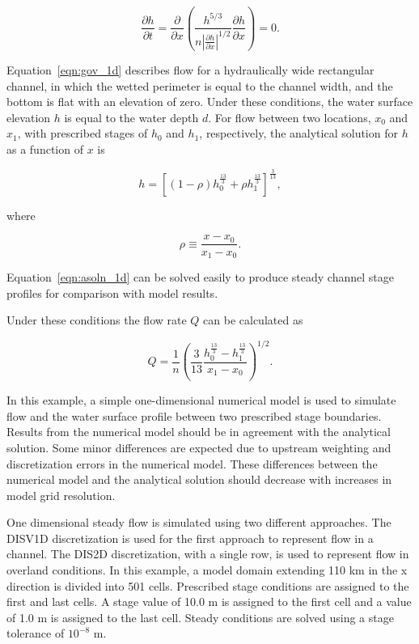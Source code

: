\documentclass[fleqn]{article}
\begin{document}
\begin{equation}
  \frac{\partial h}{\partial t} = \frac{\partial}{\partial x} 
  \left ( \frac{h^{5/3}}{n \left | \frac{\partial h}{\partial x} \right |^{1/2}} 
  \frac{\partial h}{\partial x} \right ) = 0 .
  \label{eqn:gov_1d}
\end{equation}

\noindent Equation~\ref{eqn:gov_1d} describes flow for a hydraulically wide rectangular channel, in which the wetted perimeter is equal to the channel width, and the bottom is flat with an elevation of zero.  Under these conditions, the water surface elevation $h$ is equal to the water depth $d$.  For flow between two locations, $x_0$ and $x_1$, with prescribed stages of $h_0$ and $h_1$, respectively, the analytical solution for $h$ as a function of $x$ is

\begin{equation}
  h = \left [ \left (1 - \rho \right ) h^{\frac{13}{3}}_{0} + \rho h^{\frac{13}{3}}_{1} \right ]^{\frac{3}{13}} ,
  \label{eqn:asoln_1d}
\end{equation}

\noindent where

\begin{equation}
  \rho \equiv \frac{x - x_0}{x_1 - x_0} .
  \label{eqn:rho_defined_x}
\end{equation}

\noindent Equation~\ref{eqn:asoln_1d} can be solved easily to produce steady channel stage profiles for comparison with model results.

Under these conditions the flow rate $Q$ can be calculated as

\begin{equation}
  Q = \frac{1}{n} \left ( 
    \frac{3}{13}
    \frac{h^{\frac{13}{3}}_{0} - h^{\frac{13}{3}}_{1}}{x_1 - x_0}
  \right )^{1/2}.
  \label{eqn:q_calc}
\end{equation}


In this example, a simple one-dimensional numerical model is used to simulate flow and the water surface profile between two prescribed stage boundaries.  Results from the numerical model should be in agreement with the analytical solution.  Some minor differences are expected due to upstream weighting and discretization errors in the numerical model.  These differences between the numerical model and the analytical solution should decrease with increases in model grid resolution.

One dimensional steady flow is simulated using two different approaches.  The DISV1D discretization is used for the first approach to represent flow in a channel.  The DIS2D discretization, with a single row, is used to represent flow in overland conditions.  In this example, a model domain extending 110 km in the x direction is divided into 501 cells.  Prescribed stage conditions are assigned to the first and last cells.  A stage value of 10.0 m is assigned to the first cell and a value of 1.0 m is assigned to the last cell.  Steady conditions are solved using a stage tolerance of $10^{-8}$ m.
\end{document}
